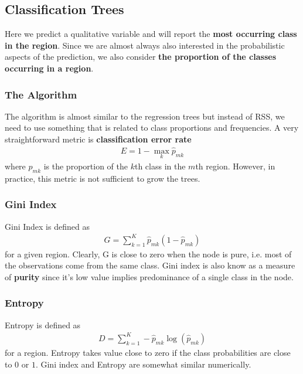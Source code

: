 \documentclass[11pt, a4paper]{article}
\begin{document}
    \subsection{Classification Trees}
    Here we predict a qualitative variable and will report the \textbf{most occurring class in the region}. Since we are almost always also interested in the probabilistic aspects of the prediction, we also consider \textbf{the proportion of the classes occurring in a region}.
    

    \subsubsection{The Algorithm}
    The algorithm is almost similar to the regression trees but instead of RSS, we need to use something that is related to class proportions and frequencies. A very straightforward metric is \textbf{classification error rate}
    \begin{align*}
        E = 1 - \max_{k}\hat{p}_{mk}
    \end{align*}
    where $\hat{p}_{mk}$ is the proportion of the $k$th class in the $m$th region. However, in practice, this metric is not sufficient to grow the trees.

    
    \subsubsection{Gini Index}
    Gini Index is defined as
    \begin{align*}
        G = \sum_{k=1}^{K} \hat{p}_{mk} (1 - \hat{p}_{mk})
    \end{align*}
    for a given region. Clearly, G is close to zero when the node is pure, i.e. most of the observations come from the same class. Gini index is also know as a measure of \textbf{purity} since it's low value implies predominance of a single class in the node.
    

    \subsubsection{Entropy}
    Entropy is defined as
    \begin{align*}
        D = \sum_{k=1}^{K} -\hat{p}_{mk} \log(\hat{p}_{mk})
    \end{align*}
    for a region. Entropy takes value close to zero if the class probabilities are close to $0$ or $1$. Gini index and Entropy are somewhat similar numerically.
\end{document}
